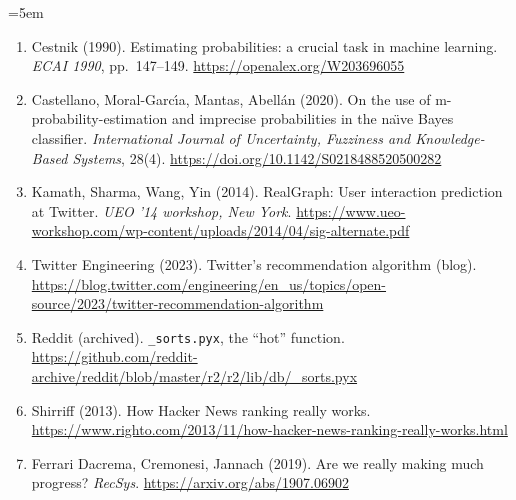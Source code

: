 {\emergencystretch=5em %
\begin{enumerate}[leftmargin=*, label=\arabic*., ref=\arabic*, itemsep=0.8em]
  \item\label{ref:cestnik1990} Cestnik (1990). Estimating probabilities: a crucial task in machine learning. \textit{ECAI 1990}, pp.\ 147--149. \url{https://openalex.org/W203696055} %
  \item\label{ref:castellano2020} Castellano, Moral-Garc{\'\i}a, Mantas, Abell{\'a}n (2020). On the use of m-probability-estimation and imprecise probabilities in the na{\"\i}ve Bayes classifier. \textit{International Journal of Uncertainty, Fuzziness and Knowledge-Based Systems}, 28(4). \url{https://doi.org/10.1142/S0218488520500282} %
  \item\label{ref:kamath2014} Kamath, Sharma, Wang, Yin (2014). RealGraph: User interaction prediction at Twitter. \textit{UEO '14 workshop, New York}. \url{https://www.ueo-workshop.com/wp-content/uploads/2014/04/sig-alternate.pdf} %
  \item\label{ref:twitter2023} Twitter Engineering (2023). Twitter's recommendation algorithm (blog). \url{https://blog.twitter.com/engineering/en_us/topics/open-source/2023/twitter-recommendation-algorithm} %
  \item\label{ref:reddit-hot} Reddit (archived). \texttt{\_sorts.pyx}, the ``hot'' function. \url{https://github.com/reddit-archive/reddit/blob/master/r2/r2/lib/db/_sorts.pyx} %
  \item\label{ref:shirriff2013} Shirriff (2013). How Hacker News ranking really works. \url{https://www.righto.com/2013/11/how-hacker-news-ranking-really-works.html} %
  \item\label{ref:ferraridacrema2019} Ferrari Dacrema, Cremonesi, Jannach (2019). Are we really making much progress? \textit{RecSys}. \url{https://arxiv.org/abs/1907.06902} %

\end{enumerate}}
